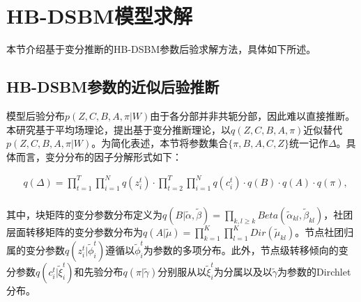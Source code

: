 \section{HB-DSBM模型求解}
本节介绍基于变分推断的HB-DSBM参数后验求解方法，具体如下所述。

\subsection{HB-DSBM参数的近似后验推断}

模型后验分布$p(Z, C, B, A, \pi | W)$由于各分部并非共轭分部，因此难以直接推断。本研究基于平均场理论，提出基于变分推断理论，以$q(Z, C, B, A, \pi)$近似替代$p(Z, C, B, A, \pi | W)$。为简化表述，本节将参数集合$\{\pi, B, A, C, Z\}$统一记作$\Delta$。具体而言，变分分布的因子分解形式如下：

\begin{equation}
\label{eq2}
\begin{split}
& q(\Delta) = \prod_{t=1}^T \prod_{i=1}^N q(z_i^t) \cdot \prod_{t=2}^T \prod_{i=1}^N q(c_i^t) \cdot q(B) \cdot q(A) \cdot q(\pi) , \\
\end{split}
\end{equation}

其中，块矩阵的变分参数分布定义为$q(B | \widetilde{\alpha}, \widetilde{\beta}) = \prod_{k,l \geq k} Beta(\widetilde{\alpha}_{kl}, \widetilde{\beta}_{kl})$，社团层面转移矩阵的变分参数分布为$q(A | \widetilde{\mu}) = \prod_{k=1}^K \prod_{l=1}^K Dir(\widetilde{\mu}_{kl})$。节点社团归属的变分参数$q(z_i^t | \widetilde{\phi}_i^t)$遵循以$\widetilde{\phi}_i^t$为参数的多项分布。此外，节点级转移倾向的变分参数$q(c_i^t | \widetilde{\xi}_i^t)$和先验分布$q(\pi | \widetilde{\gamma})$分别服从以$\widetilde{\xi}_i^t$为分属以及以$\widetilde{\gamma}$为参数的Dirchlet分布。




